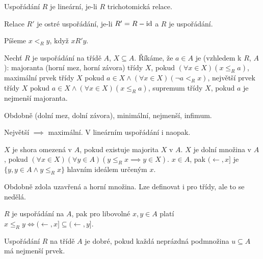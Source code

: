 \documentclass[12pt]{article}                   %
\begin{document}
    \begin{definice}
        Uspořádání $R$ je lineární, je-li $R$ trichotomická relace.
    \end{definice}

    \begin{definice}
        Relace $R'$ je ostré uspořádání, je-li $R' = R - \operatorname{id}$ a $R$ je uspořádání.

        Píšeme $x <_R y$, když $xR'y$.
    \end{definice}

    \begin{definice}
        Nechť $R$ je uspořádání na třídě $A$, $X \subseteq A$. Říkáme, že $a \in A$ je (vzhledem k $R$, $A$): majoranta (horní mez, horní závora) třídy $X$, pokud $(\forall x \in X)(x ≤_R a)$, maximální prvek třídy $X$ pokud $a \in X \land (\forall x \in X)(\neg a <_R x)$, největší prvek třídy $X$ pokud $a \in X \land (\forall x \in X)(x ≤_R a)$, supremum třídy $X$, pokud $a$ je nejmenší majoranta.

        Obdobně (dolní mez, dolní závora), minimální, nejmenší, infimum.
    \end{definice}

    \begin{pozorovani}
        Největší $\implies$ maximální. V lineárním uspořádání i naopak.
    \end{pozorovani}

    \begin{definice}
        $X$ je shora omezená v $A$, pokud existuje majorita $X$ v $A$. $X$ je dolní množina v $A$, pokud $(\forall x \in X)(\forall y \in A)(y ≤_Rx \implies y \in X)$. $x \in A$, pak $(\leftarrow, x]$ je $\{y, y \in A \land y ≤_R x\}$ hlavním ideálem určeným $x$.

        Obdobně zdola uzavřená a horní množina. Lze definovat i pro třídy, ale to se nedělá.
    \end{definice}

    \begin{pozorovani}
        $R$ je uspořádání na $A$, pak pro libovolné $x, y \in A$ platí $x ≤_R y \Leftrightarrow (\leftarrow, x]\subseteq(\leftarrow, y]$.
    \end{pozorovani}

    \begin{definice}
        Uspořádání $R$ na třídě $A$ je dobré, pokud každá neprázdná podmnožina $u \subseteq A$ má nejmenší prvek.
    \end{definice}
\end{document}
